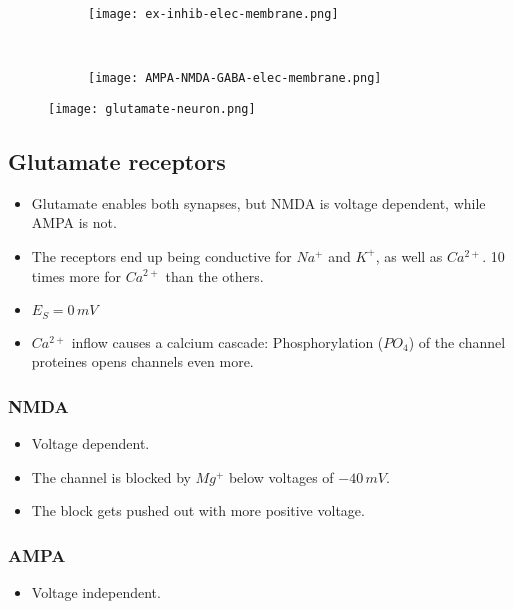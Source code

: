 \documentclass[main]{subfiles}
\begin{document}
\begin{figure}[H]
	\centering
	\begin{subfigure}[b]{0.5\textwidth}
    	\centering
		\texttt{[image: ex-inhib-elec-membrane.png]}
	\end{subfigure}%
	~
	\begin{subfigure}[b]{0.5\textwidth}
		\centering
		\texttt{[image: AMPA-NMDA-GABA-elec-membrane.png]}
	\end{subfigure}
\end{figure}

\begin{figure}[H]
	\centering
 	\texttt{[image: glutamate-neuron.png]}
\end{figure} 

\subsection{Glutamate receptors}
\begin{itemize}[noitemsep,nolistsep]
	\item Glutamate enables both synapses, but NMDA is voltage dependent, while AMPA is not.
	\item The receptors end up being conductive for $Na^+$ and $K^+$, as well as $Ca^{2+}$. 10 times more for $Ca^{2+}$ than the others.
	\item $E_S = 0\,mV$
	\item $Ca^{2+}$ inflow causes a calcium cascade: Phosphorylation ($PO_4$) of the channel proteines opens channels even more.
\end{itemize}

\subsubsection{NMDA}
\begin{itemize}[noitemsep,nolistsep]
	\item Voltage dependent.
	\item The channel is blocked by $Mg^+$ below voltages of $-40\,mV$.
	\item The block gets pushed out with more positive voltage.
\end{itemize}

\subsubsection{AMPA}
\begin{itemize}[noitemsep,nolistsep]
	\item Voltage independent.
\end{itemize}
\end{document}
